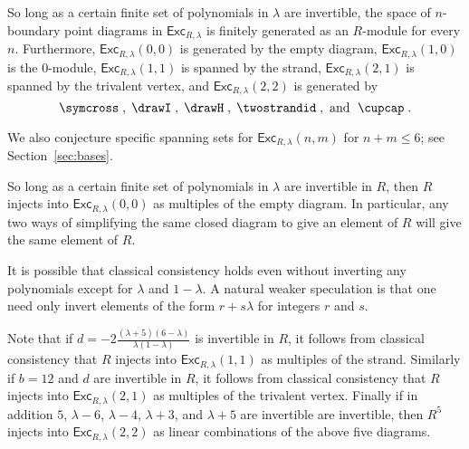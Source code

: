 \documentclass[12pt]{amsart}
\begin{document}
\begin{conjecture}
  \label{conj:class-suffic}
So long as a certain finite set of polynomials in $\lambda$ are invertible,
the space of $n$-boundary point diagrams in $\mathsf{Exc}_{R,\lambda}$ is
finitely generated as an $R$-module for every $n$.  Furthermore,
$\mathsf{Exc}_{R,\lambda}(0,0)$ is generated by the empty diagram,
$\mathsf{Exc}_{R,\lambda}(1,0)$ is the $0$-module,
$\mathsf{Exc}_{R,\lambda}(1,1)$ is spanned by the strand,
$\mathsf{Exc}_{R,\lambda}(2,1)$ is spanned by the trivalent vertex, and
$\mathsf{Exc}_{R,\lambda}(2,2)$ is generated by $$\symcross\;, \; \drawI \;,
\; \drawH \;, \; \twostrandid \;, \text{ and } \; \cupcap \; .$$
\end{conjecture}

We also conjecture specific spanning sets for $\mathsf{Exc}_{R,\lambda}(n,m)$
for $n+m \leq 6$; see Section~\ref{sec:bases}.

\begin{conjecture}
  \label{conj:class-consist}
So long as a certain finite set of polynomials in $\lambda$ are invertible in
$R$, then $R$ injects into $\mathsf{Exc}_{R,\lambda}(0,0)$ as multiples of the
empty diagram.  In particular, any two ways of simplifying the same closed
diagram to give an element of $R$ will give the same element of $R$.
\end{conjecture}

\begin{remark}
It is possible that classical consistency holds even without inverting any polynomials
except for $\lambda$ and $1-\lambda$.  A natural weaker speculation is that one need
only invert elements of the form $r+s\lambda$ for integers $r$ and $s$.
\end{remark}

Note that if $d = -2\frac{(\lambda+5)(6-\lambda)}{\lambda(1-\lambda)}$ is 
invertible in $R$, it follows from classical consistency
that $R$ injects into $\mathsf{Exc}_{R,\lambda}(1,1)$ as multiples of the
strand.  Similarly if $b = 12$ and $d$ are invertible in $R$, it follows from
classical consistency that $R$ injects into $\mathsf{Exc}_{R,\lambda}(2,1)$ as
multiples of the trivalent vertex.  Finally if in addition
$5$, $\lambda-6$, $\lambda-4$, $\lambda+3$, and $\lambda+5$ are invertible
are invertible, then $R^5$ injects into $\mathsf{Exc}_{R,\lambda}(2,2)$ as
linear combinations of the above five diagrams.
\end{document}
